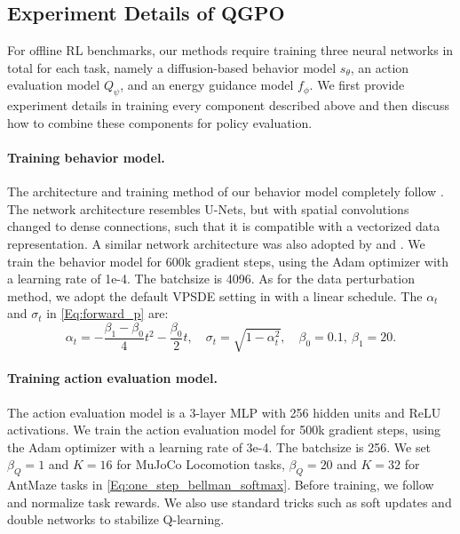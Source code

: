 \subsection{Experiment Details of QGPO}
\label{sec:exp_details_rl}
For offline RL benchmarks, our methods require training three neural networks in total for each task, namely a diffusion-based behavior model $s_\theta$, an action evaluation model $Q_\psi$, and an energy guidance model $f_\phi$. We first provide experiment details in training every component described above and then discuss how to combine these components for policy evaluation.

\paragraph{Training behavior model.}
The architecture and training method of our behavior model completely follow \citet{sfbc}. The network architecture resembles U-Nets, but with
spatial convolutions changed to dense connections, such that it is compatible with a vectorized data representation. A similar network architecture was also adopted by \citet{diffuser} and \citet{csbc}. We train the behavior model for 600k gradient steps, using the Adam optimizer with a learning rate of 1e-4. The batchsize is 4096. As for the data perturbation method, we adopt the default VPSDE setting in \citep{song2020score} with a linear schedule. The $\alpha_t$ and $\sigma_t$ in \eqref{Eq:forward_p} are:
\begin{equation}
    \alpha_t = -\frac{\beta_1 - \beta_0}{4}t^2 - \frac{\beta_0}{2}t, \quad \sigma_t = \sqrt{1 - \alpha_t^2}, \quad \beta_0=0.1,\ \beta_1=20.
\end{equation}


\paragraph{Training action evaluation model.}
The action evaluation model is a 3-layer MLP with 256 hidden units and ReLU activations. We train the action evaluation model for 500k gradient steps, using the Adam optimizer with a learning rate of 3e-4. The batchsize is 256. We set $\beta_Q=1$ and $K=16$ for MuJoCo Locomotion tasks, $\beta_Q=20$ and $K=32$ for AntMaze tasks in \eqref{Eq:one_step_bellman_softmax}. 
Before training, we follow \citet{iql} and normalize task rewards. We also use standard tricks such as soft updates \citep{ddpg} and double networks \citep{td3} to stabilize Q-learning.


